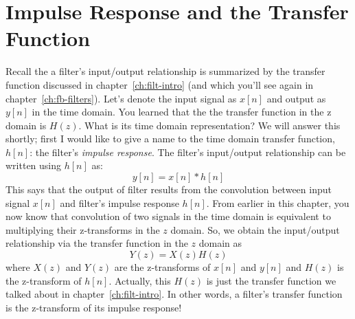 
\section{Impulse Response and the Transfer Function}

Recall the a filter's input/output relationship is summarized by the
transfer function discussed in chapter~\ref{ch:filt-intro} (and which
you'll see again in chapter~\ref{ch:fb-filters}). Let's denote the
input signal as $x[n]$ and output as $y[n]$ in the time domain. You
learned that the the transfer function in the z domain is $H(z)$. What
is its time domain representation? We will answer this shortly; first
I would like to give a name to the time domain transfer function,
$h[n]$: the filter's
\emph{impulse response}. The filter's input/output relationship can be
written using $h[n]$ as:
\begin{equation}
y[n] = x[n] \ast h[n]
\label{eq:zt-hx}
\end{equation}
This says that the output of filter results from the convolution
between input signal $x[n]$ and filter's impulse response $h[n]$. From
earlier in this chapter, you now know that convolution of two signals
in the time domain is equivalent to multiplying their z-transforms in
the $z$ domain. So, we obtain the input/output relationship via the
transfer function in the $z$ domain as
\begin{equation}
Y(z) =X(z)H(z)
\label{eq:zt-HX}
\end{equation}
where $X(z)$ and $Y(z)$ are the z-transforms of $x[n]$ and $y[n]$ and
$H(z)$ is the z-transform of $h[n]$.  Actually, this $H(z)$ is just
the transfer function we talked about in chapter~\ref{ch:filt-intro}.
In other words, a filter's transfer function is the z-transform of its
impulse response!

